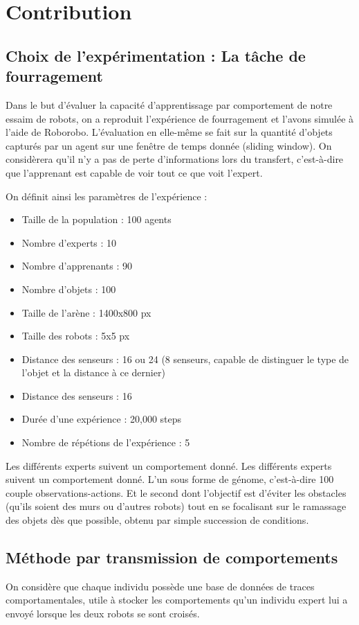 \documentclass[a4paper, 12pt]{report}
\begin{document}
    \chapter{Contribution}
   
    \section{Choix de l'expérimentation : La tâche de fourragement}
    Dans le but d'évaluer la capacité d'apprentissage par comportement de notre essaim de robots, on a reproduit l'expérience de fourragement et l'avons simulée à l'aide de Roborobo.
    L'évaluation en elle-même se fait sur la quantité d'objets capturés par un agent sur une fenêtre de temps donnée (sliding window). On considèrera qu'il n'y a pas de perte d'informations lors du transfert, c'est-à-dire que l'apprenant est capable de voir tout ce que voit l'expert.
    
    On définit ainsi les paramètres de l'expérience :
    \begin{itemize}
    \item Taille de la population : 100 agents
    \item Nombre d'experts : 10
    \item Nombre d'apprenants : 90
    \item Nombre d'objets : 100
    \item Taille de l'arène : 1400x800 px
    \item Taille des robots : 5x5 px
    \item Distance des senseurs : 16 ou 24 (8 senseurs, capable de distinguer le type de l'objet et la distance à ce dernier)
    \item Distance des senseurs : 16
    \item Durée d'une expérience : 20,000 steps
    \item Nombre de répétions de l'expérience : 5
    \end{itemize}
    

Les différents experts suivent un comportement donné.
Les différents experts suivent un comportement donné.
L'un sous forme de génome, c'est-à-dire 100 couple observations-actions.
Et le second dont l'objectif est d'éviter les obstacles (qu'ils soient des murs ou d'autres robots) tout en se focalisant sur le ramassage des objets dès que possible, obtenu par simple succession de conditions.


	\section{Méthode par transmission de comportements}
	On considère que chaque individu possède une base de données de traces comportamentales, utile à stocker les comportements qu'un individu expert lui a envoyé lorsque les deux robots se sont croisés.
	
\end{document}
